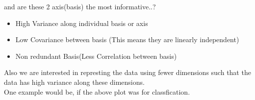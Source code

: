 \documentclass{article}
\begin{document}
and are these 2 axis(basis) the most informative..?\\
\begin{tcolorbox}[colback=blue!5!white,colframe=blue!75!black,title=Ideal Basis Properties]
  \begin{itemize}
    \item High Variance along individual basis or axis
    \item Low Covariance between basis (This means they are linearly independent)
    \item Non redundant Basis(Less Correlation between basis)
  \end{itemize}
\end{tcolorbox}
Also we are interested in represting the data using fewer dimensions such that the data has high variance along these dimensions.\\
One example would be, if the above plot was for classfication.\\
\\
\end{document}
